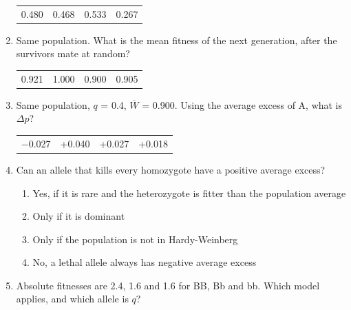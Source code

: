 \documentclass[11pt]{article}
\newcommand{\work}[1]{\par\vspace{#1}}
\begin{document}
\begin{enumerate}[label=\textbf{\arabic*.}, leftmargin=2em, itemsep=1.4em]
\begin{tabularx}{\linewidth}{@{}YYYY@{}}
0.480 & 0.468 & 0.533 & 0.267 \\
\end{tabularx}
\work{1.6cm}
\item Same population. What is the mean fitness of the next generation, after the survivors mate at random?
\par\smallskip\noindent\begin{tabularx}{\linewidth}{@{}YYYY@{}}
0.921 & 1.000 & 0.900 & 0.905 \\
\end{tabularx}
\item Same population, \(q\) = 0.4, \(\overline{W}\) = 0.900. Using the average excess of A, what is \(\Delta p\)?
\par\smallskip\noindent\begin{tabularx}{\linewidth}{@{}YYYY@{}}
\(-\)0.027 & +0.040 & +0.027 & +0.018 \\
\end{tabularx}
\work{1.6cm}
\item Can an allele that kills every homozygote have a positive average excess?
\par\smallskip
\begin{enumerate}[label={}, leftmargin=2.4em, labelwidth=0pt, itemsep=2pt, topsep=0pt]
\item \hspace*{-2.4em}Yes, if it is rare and the heterozygote is fitter than the population average
\item \hspace*{-2.4em}Only if it is dominant
\item \hspace*{-2.4em}Only if the population is not in Hardy-Weinberg
\item \hspace*{-2.4em}No, a lethal allele always has negative average excess
\end{enumerate}
\item Absolute fitnesses are 2.4, 1.6 and 1.6 for BB, Bb and bb. Which model applies, and which allele is \(q\)?

\end{enumerate}
\end{document}
